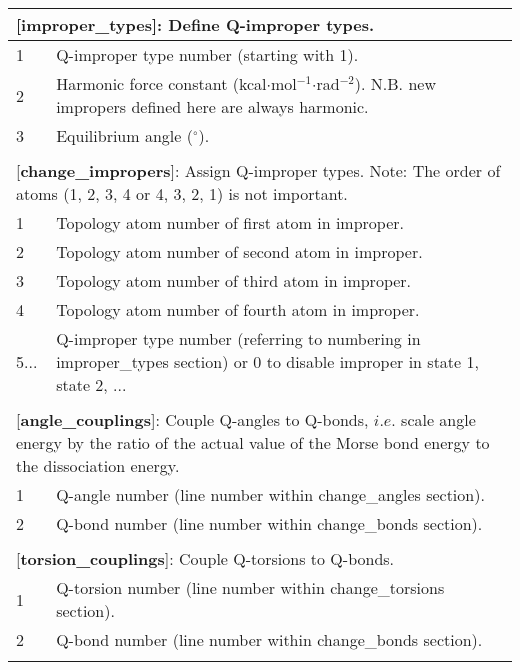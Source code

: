 \documentclass[a4paper,10pt]{article}
\begin{document}
\begin{longtable}{|p{53pt}|p{181pt}|p{160pt}|}
\multicolumn{3}{p{394pt}}{[\textbf{improper\_types}]: Define Q-improper types.}\\
\hline 1 & \multicolumn{2}{p{341pt}|}{Q-improper type number (starting with 1).}\\
\hline 2 & \multicolumn{2}{p{341pt}|}{Harmonic force constant (kcal$\cdot$mol$^{-1}$$\cdot$rad$^{-2}$). N.B. new impropers defined here are always harmonic.}\\
\hline 3 & \multicolumn{2}{p{341pt}|}{Equilibrium angle ($^{\circ}$).}\\
\hline
\multicolumn{3}{p{394pt}}{}\\

\multicolumn{3}{p{394pt}}{[\textbf{change\_impropers}]: Assign Q-improper types. Note: The order of atoms (1, 2, 3, 4 or 4, 3, 2, 1) is not important.}\\
\hline 1 & \multicolumn{2}{p{341pt}|}{Topology atom number of first atom in improper.}\\
\hline 2 & \multicolumn{2}{p{341pt}|}{Topology atom number of second atom in improper.}\\
\hline 3 & \multicolumn{2}{p{341pt}|}{Topology atom number of third atom in improper.}\\
\hline 4 & \multicolumn{2}{p{341pt}|}{Topology atom number of fourth atom in improper.}\\
\hline 5... & \multicolumn{2}{p{341pt}|}{Q-improper type number (referring to numbering in improper\_types section) or 0 to disable improper in state 1, state 2, ...}\\
\hline
\multicolumn{3}{p{394pt}}{}\\

\multicolumn{3}{p{394pt}}{[\textbf{angle\_couplings}]: Couple Q-angles to Q-bonds, $i.e.$ scale angle energy by the ratio of the actual value of the Morse bond energy to the dissociation energy.}\\
\hline 1 & \multicolumn{2}{p{341pt}|}{Q-angle number (line number within change\_angles section).}\\
\hline 2 & \multicolumn{2}{p{341pt}|}{Q-bond number (line number within change\_bonds section).}\\
\hline
\multicolumn{3}{p{394pt}}{}\\

\multicolumn{3}{p{394pt}}{[\textbf{torsion\_couplings}]: Couple Q-torsions to Q-bonds.}\\
\hline 1 & \multicolumn{2}{p{341pt}|}{Q-torsion number (line number within change\_torsions section).}\\
\hline 2 & \multicolumn{2}{p{341pt}|}{Q-bond number (line number within change\_bonds section).}\\
\hline
\multicolumn{3}{p{394pt}}{}\\


\end{longtable}
\end{document}
